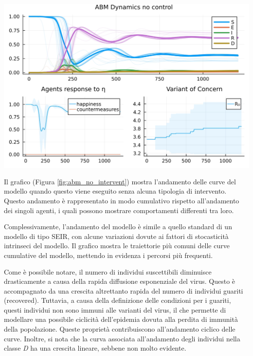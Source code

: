 \begin{minipage}{\linewidth}
    \centering
    \includegraphics[width=\textwidth]{img/SocialNetworkABM_NO_CONTROL.jpg}
    \label{fig:abm_no_intervent}
\end{minipage}

Il grafico (Figura \ref{fig:abm_no_intervent}) mostra 
l'andamento delle curve del modello quando questo viene eseguito 
senza alcuna tipologia di intervento. Questo andamento è rappresentato 
in modo cumulativo rispetto all'andamento dei singoli agenti, 
i quali possono mostrare comportamenti differenti tra loro.

Complessivamente, l'andamento del modello è simile a quello 
standard di un modello di tipo SEIR, con alcune variazioni 
dovute ai fattori di stocasticità intrinseci del modello. 
Il grafico mostra le traiettorie più comuni delle curve cumulative 
del modello, mettendo in evidenza i percorsi più frequenti.

Come è possibile notare, il numero di individui suscettibili 
diminuisce drasticamente a causa della rapida diffusione 
esponenziale del virus. Questo è accompagnato da una crescita 
altrettanto rapida del numero di individui guariti (recovered). 
Tuttavia, a causa della definizione delle condizioni per i guariti, 
questi individui non sono immuni alle varianti del virus, il che 
permette di modellare una possibile ciclicità dell'epidemia 
dovuta alla perdita di immunità della popolazione. 
Queste proprietà contribuiscono all'andamento ciclico delle curve. 
Inoltre, si nota che la curva associata all'andamento degli 
individui nella classe \emph{D} ha una crescita lineare, 
sebbene non molto evidente.

